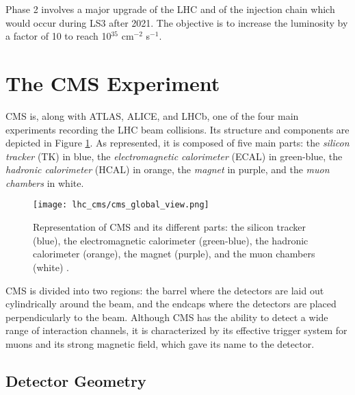             Phase 2 involves a major upgrade of the LHC and of the injection chain which would occur during LS3 after 2021. The objective is to increase the luminosity by a factor of 10 to reach 10$ ^{35} $ cm$ ^{-2} $ s$ ^{-1} $.

    \section{The CMS Experiment}

        CMS \Cite{1748-0221-3-08-S08004} is, along with ATLAS, ALICE, and LHCb, one of the four main experiments recording the LHC beam collisions. Its structure and components are depicted in Figure \ref{fig:lhc_and_cms__cms_global_view}. As represented, it is composed of five main parts: the \emph{silicon tracker} (TK) in blue, the \emph{electromagnetic calorimeter} (ECAL) in green-blue, the \emph{hadronic calorimeter} (HCAL) in orange, the \emph{magnet} in purple, and the \emph{muon chambers} in white. \\
        
        \begin{figure}[h!]
            \centering
            \texttt{[image: lhc\_cms/cms\_global\_view.png]}
            \caption{Representation of CMS and its different parts: the silicon tracker (blue), the electromagnetic calorimeter (green-blue), the hadronic calorimeter (orange), the magnet (purple), and the muon chambers (white) \Cite{Fig:cms-detector-design}.}
            \label{fig:lhc_and_cms__cms_global_view}
        \end{figure}

        CMS is divided into two regions: the barrel where the detectors are laid out cylindrically around the beam, and the endcaps where the detectors are placed perpendicularly to the beam. Although CMS has the ability to detect a wide range of interaction channels, it is characterized by its effective trigger system for muons and its strong magnetic field, which gave its name to the detector.

        \subsection{Detector Geometry}

